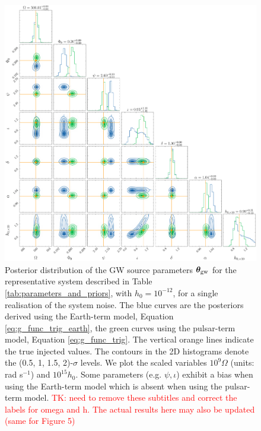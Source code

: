 \documentclass[fleqn,usenatbib,useAMS]{mnras}
\begin{document}
	\begin{figure}
	\includegraphics[width=\textwidth, height =\textwidth ]{images/corner_highSNR_compare}
	\caption{Posterior distribution of the GW source parameters $\boldsymbol{\theta}_{\rm gw}$ for the representative system described in Table \ref{tab:parameters_and_priors}, with $h_0 = 10^{-12}$, for a single realisation of the system noise. The blue curves are the posteriors derived using the Earth-term model, Equation \eqref{eq:g_func_trig_earth}, the green curves using the pulsar-term model, Equation \eqref{eq:g_func_trig}. The vertical orange lines indicate the true injected values. The contours in the 2D histograms denote the (0.5, 1, 1.5, 2)-$\sigma$ levels. We plot the scaled variables $10^9 \Omega$ (units: rad s$^{-1}$) and $10^{15} h_0$. Some parameters (e.g. $\psi, \iota$) exhibit a bias when using the Earth-term model which is absent when using the pulsar-term model. \textcolor{red}{TK: need to remove these subtitles and correct the labels for omega and h. The actual results here may also be updated (same for Figure 5)}}
	\label{fig:corner_plot_compare_high}
\end{figure}
\end{document}
